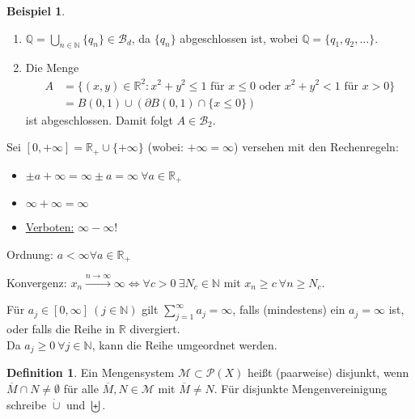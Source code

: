 \documentclass[a4paper]{report}
\newcommand{\PowerSet}{\mathcal{P}}
\newcommand{\R}{\mathbb{R}}
\newcommand{\N}{\mathbb{N}}
\newcommand{\Q}{\mathbb{Q}}
\newcommand{\Borel}{\mathcal{B}}
\newcommand{\Bd}{\Borel_d}
\newcommand{\dcup}{\dot{\cup}}
\newcommand{\bigdcup}{\biguplus}
\newcommand{\jspacesmall}{\vspace{4pt}}
\theoremstyle{plain}
\theoremstyle{definition}
\newtheorem*{defn*}{Definition}
\newtheorem*{expl*}{Beispiel}
\begin{document}
{{\begin{expl*}
    \begin{enumerate}
        \item $\Q = \bigcup_{n\in\N} \{q_n\} \in \Bd$, da $\{q_n\}$ abgeschlossen ist, wobei $\Q = \{q_1, q_2, \dots\}$.
        \item Die Menge 
        \begin{displaymath}
            \begin{split}
                A &= \{(x,y) \in \R^2 : x^2 + y^2 \le 1\text{ für }x \le 0\text{ oder }x^2 + y^2 < 1\text{ für }x > 0\}\\
                &= B(0,1) \cup (\partial B(0,1) \cap \{x\le 0\})
            \end{split}
        \end{displaymath}
        ist abgeschlossen. Damit folgt $A\in \Borel_2$.
    \end{enumerate}
\end{expl*}


Sei $[0, +\infty] = \R_+ \cup \{+\infty\}$ (wobei: $+\infty = \infty$) versehen mit den Rechenregeln:
\begin{itemize}
    \item $\pm a +\infty = \infty \pm a = \infty \ \forall a\in \R_+$
    \item $\infty + \infty = \infty$
    \item \uline{Verboten:} $\infty - \infty$!
\end{itemize}
Ordnung: $a < \infty \forall a \in \R_+$

\jspacesmall

Konvergenz: $x_n \xrightarrow{n\rightarrow \infty} \infty \Leftrightarrow \forall c>0\  \exists N_c \in \N$ mit $x_n \ge c\ \forall n \ge N_c$.

\jspacesmall

Für $a_j \in [0,\infty] \ (j \in \N)$ gilt $\sum_{j=1}^\infty a_j = \infty$, falls (mindestens) ein $a_j = \infty$ ist, oder falls die Reihe in $\R$ divergiert.\\
Da $a_j\ge 0 \ \forall j\in\N$, kann die Reihe umgeordnet werden.

\begin{defn*}
    Ein Mengensystem $\mathcal{M} \subset \PowerSet(X)$ heißt (paarweise) disjunkt, wenn $\overline{M} \cap N \ne \emptyset$ für alle $\overline{M}, N \in \mathcal{M}$ mit $\overline{M} \ne N$. Für disjunkte Mengenvereinigung schreibe $\dcup$ und $\bigdcup$.
\end{defn*}

}}
\end{document}
